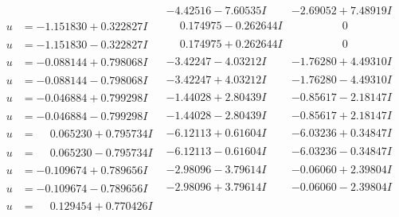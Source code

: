 \documentclass[1p]{elsarticle_modified}
\theoremstyle{definition}
\begin{document}
$$\begin{array}{c|c|c}
 & -4.42516 - 7.60535 I & -2.69052 + 7.48919 I \\ \hline\begin{aligned}
u &= -1.151830 + 0.322827 I\end{aligned}
 & \phantom{-}0.174975 - 0.262644 I & \phantom{-0.000000 } 0 \\ \hline\begin{aligned}
u &= -1.151830 - 0.322827 I\end{aligned}
 & \phantom{-}0.174975 + 0.262644 I & \phantom{-0.000000 } 0 \\ \hline\begin{aligned}
u &= -0.088144 + 0.798068 I\end{aligned}
 & -3.42247 - 4.03212 I & -1.76280 + 4.49310 I \\ \hline\begin{aligned}
u &= -0.088144 - 0.798068 I\end{aligned}
 & -3.42247 + 4.03212 I & -1.76280 - 4.49310 I \\ \hline\begin{aligned}
u &= -0.046884 + 0.799298 I\end{aligned}
 & -1.44028 + 2.80439 I & -0.85617 - 2.18147 I \\ \hline\begin{aligned}
u &= -0.046884 - 0.799298 I\end{aligned}
 & -1.44028 - 2.80439 I & -0.85617 + 2.18147 I \\ \hline\begin{aligned}
u &= \phantom{-}0.065230 + 0.795734 I\end{aligned}
 & -6.12113 + 0.61604 I & -6.03236 + 0.34847 I \\ \hline\begin{aligned}
u &= \phantom{-}0.065230 - 0.795734 I\end{aligned}
 & -6.12113 - 0.61604 I & -6.03236 - 0.34847 I \\ \hline\begin{aligned}
u &= -0.109674 + 0.789656 I\end{aligned}
 & -2.98096 - 3.79614 I & -0.06060 + 2.39804 I \\ \hline\begin{aligned}
u &= -0.109674 - 0.789656 I\end{aligned}
 & -2.98096 + 3.79614 I & -0.06060 - 2.39804 I \\ \hline\begin{aligned}
u &= \phantom{-}0.129454 + 0.770426 I\end{aligned}

\end{array}$$
\end{document}
